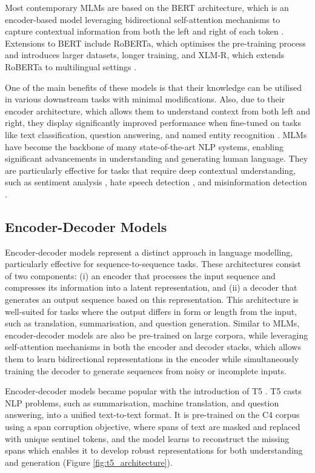 Most contemporary \acp{MLM} are based on the BERT architecture, which is an encoder-based model leveraging bidirectional self-attention mechanisms to capture contextual information from both the left and right of each token \cite{BERT}. Extensions to BERT include RoBERTa, which optimises the pre-training process and introduces larger datasets, longer training, and XLM-R, which extends RoBERTa to multilingual settings \cite{ROBERTA, conneau2019unsupervised}.

One of the main benefits of these models is that their knowledge can be utilised in various downstream tasks with minimal modifications. Also, due to their encoder architecture, which allows them to understand context from both left and right, they display significantly improved performance when fine-tuned on tasks like text classification, question answering, and named entity recognition \cite{yang-etal-2023-glue}. \acp{MLM} have become the backbone of many state-of-the-art \ac{NLP} systems, enabling significant advancements in understanding and generating human language. They are particularly effective for tasks that require deep contextual understanding, such as sentiment analysis \cite{alaparthi2021bert}, hate speech detection \cite{mozafari2019bert}, and misinformation detection \cite{kaliyar2021fakebert}.

\subsection{Encoder-Decoder Models}

Encoder-decoder models represent a distinct approach in language modelling, particularly effective for sequence-to-sequence tasks. These architectures consist of two components: (i) an encoder that processes the input sequence and compresses its information into a latent representation, and (ii) a decoder that generates an output sequence based on this representation. This architecture is well-suited for tasks where the output differs in form or length from the input, such as translation, summarisation, and question generation. Similar to \acp{MLM}, encoder-decoder models are also be pre-trained on large corpora, while leveraging self-attention mechanisms in both the encoder and decoder stacks, which allows them to learn bidirectional representations in the encoder while simultaneously training the decoder to generate sequences from noisy or incomplete inputs. 

Encoder-decoder models became popular with the introduction of T5 \cite{T5}. T5 casts  \ac{NLP} problems, such as summarisation, machine translation, and question answering, into a unified text-to-text format. It is pre-trained on the \ac{C4} corpus\cite{T5}  using a span corruption objective, where spans of text are masked and replaced with unique sentinel tokens, and the model learns to reconstruct the missing spans which enables it to develop robust representations for both understanding and generation (Figure \ref{fig:t5_architecture}). 

